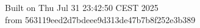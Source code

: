 {\noindent Built on Thu Jul 31 23:42:50 CEST 2025} \\ 
 {\noindent from 563119eed2d7bdeee9d313de47b7b8f252e3b389}
